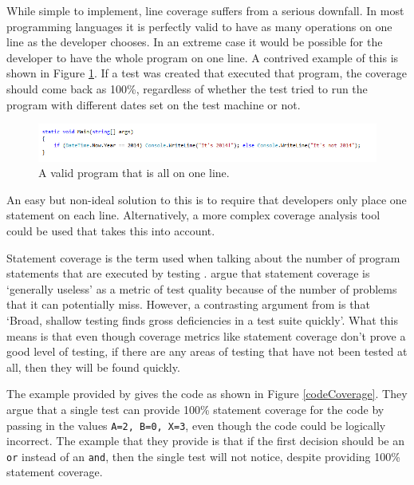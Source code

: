 While simple to implement, line coverage suffers from a serious downfall. In most programming languages it is perfectly valid to have as many operations on one line as the developer chooses. In an extreme case it would be possible for the developer to have the whole program on one line. A contrived example of this is shown in Figure \ref{lineCoverage}. If a test was created that executed that program, the coverage should come back as 100\%, regardless of whether the test tried to run the program with different dates set on the test machine or not.

\begin{figure}
	\begin{center}
		\includegraphics[width=6in]{figures/line_coverage.png}
	\end{center}
\caption{A valid program that is all on one line.}
\label{lineCoverage}
\end{figure}

An easy but non-ideal solution to this is to require that developers only place one statement on each line. Alternatively, a more complex coverage analysis tool could be used that takes this into account.

Statement coverage is the term used when talking about the number of program statements that are executed by testing \citep{Myers:2004:AST:983238}. \citet{Myers:2004:AST:983238} argue that statement coverage is `generally useless' as a metric of test quality because of the number of problems that it can potentially miss. However, a contrasting argument from \citep{bullsEyeBranchDecision} is that `Broad, shallow testing finds gross deficiencies in a test suite quickly'. What this means is that even though coverage metrics like statement coverage don't prove a good level of testing, if there are any areas of testing that have not been tested at all, then they will be found quickly.

The example provided by \citet{Myers:2004:AST:983238} gives the code as shown in Figure \ref{codeCoverage}. They argue that a single test can provide 100\% statement coverage for the code by passing in the values \verb+A=2, B=0, X=3+, even though the code could be logically incorrect. The example that they provide is that if the first decision should be an \verb+or+ instead of an \verb+and+, then the single test will not notice, despite providing 100\% statement coverage.

